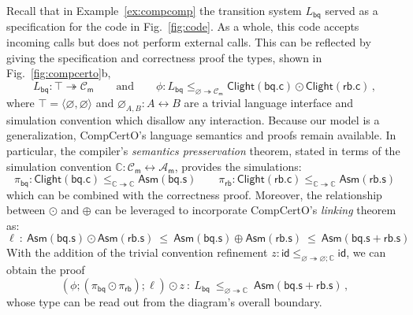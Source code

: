 \documentclass[acmsmall,screen,review,anonymous]{acmart}
\newcommand{\kw}[1]{\ensuremath{ \mathsf{#1} }}
\begin{document}
\begin{example} \label{ex:compcerto-sd} %

Recall that in Example~\ref{ex:compcomp}
the transition system $L_\kw{bq}$
served as a specification for the code in Fig.~\ref{fig:code}.
As a whole, this code
accepts incoming calls but does not perform external calls.
This can be reflected by giving the specification
and correctness proof
the types,
shown in Fig.~\ref{fig:compcerto}b,
\[
  L_\kw{bq} : \top \twoheadrightarrow \mathcal{C}_\kw{m}
  \qquad
  \text{and}
  \qquad
  \phi :
  L_\kw{bq} \le_{\varnothing \twoheadrightarrow \mathcal{C}_\kw{m}}
    \kw{Clight}(\kw{bq.c}) \odot \kw{Clight}(\kw{rb.c})
  \,,
\]
where $\top = \langle \varnothing, \varnothing \rangle$
and $\varnothing_{A,B} : A \leftrightarrow B$
are a trivial language interface and simulation convention
which disallow any interaction.
%
Because our model is a generalization,
CompCertO's
language semantics and proofs
remain available.
In particular,
the compiler's \emph{semantics presservation} theorem,
stated in terms of the simulation convention
$\mathbb{C} : \mathcal{C}_\kw{m} \leftrightarrow \mathcal{A}_\kw{m}$,
provides the simulations:
\[
  \pi_\kw{bq} :
    \kw{Clight}(\kw{bq.c})
    \le_{\mathbb{C} \twoheadrightarrow \mathbb{C}}
    \kw{Asm}(\kw{bq.s})
  \qquad
  \pi_\kw{rb} :
    \kw{Clight}(\kw{rb.c})
    \le_{\mathbb{C} \twoheadrightarrow \mathbb{C}}
    \kw{Asm}(\kw{rb.s})
\]
which can be combined with the correctness proof.
Moreover,
the relationship between $\odot$ and $\oplus$
can be leveraged to incorporate CompCertO's
\emph{linking} theorem as:
\[
  \ell \::\:
  \kw{Asm}(\kw{bq.s}) \odot \kw{Asm}(\kw{rb.s}) \:\le\:
  \kw{Asm}(\kw{bq.s}) \oplus \kw{Asm}(\kw{rb.s}) \:\le\:
  \kw{Asm}(\kw{bq.s + rb.s})
\]
With the addition of the trivial convention refinement
$z : \kw{id}
     \le_{\varnothing \twoheadrightarrow \varnothing \mathbin; \mathbb{C}}
     \kw{id}$,
we can obtain the proof
\[
  (\phi \mathbin; (\pi_\kw{bq} \odot \pi_\kw{rb}) \mathbin; \ell) \odot z
  \::\:
  L_\kw{bq}
  \:\le_{\varnothing \twoheadrightarrow \mathbb{C}}\:
  \kw{Asm}(\kw{bq.s + rb.s})
  \,,
\]
whose type can be read out from the diagram's overall boundary.


\end{example}
\end{document}
